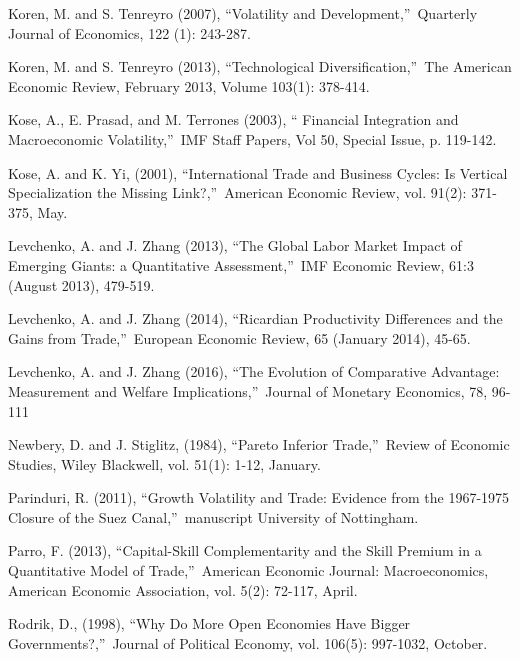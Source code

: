 \documentclass[12pt]{article}
\begin{document}
\begin{thebibliography}{99}
\bibitem{} Koren, M. and S. Tenreyro (2007), \textquotedblleft Volatility
and Development,\textquotedblright\ Quarterly Journal of Economics, 122 (1):
243-287.

\bibitem{} Koren, M. and S. Tenreyro (2013), \textquotedblleft Technological
Diversification,\textquotedblright\ The American Economic Review, February
2013, Volume 103(1): 378-414.

\bibitem{} Kose, A., E. Prasad, and M. Terrones (2003), \textquotedblleft
Financial Integration and Macroeconomic Volatility,\textquotedblright\ IMF
Staff Papers, Vol 50, Special Issue, p. 119-142.

\bibitem{} Kose, A. and K. Yi, (2001), \textquotedblleft International Trade
and Business Cycles: Is Vertical Specialization the Missing
Link?,\textquotedblright\ American Economic Review, vol. 91(2): 371-375, May.

\bibitem{} Levchenko, A. and J. Zhang (2013), \textquotedblleft The Global
Labor Market Impact of Emerging Giants: a Quantitative
Assessment,\textquotedblright\ IMF Economic Review, 61:3 (August 2013),
479-519.

\bibitem{} Levchenko, A. and J. Zhang (2014), \textquotedblleft Ricardian
Productivity Differences and the Gains from Trade,\textquotedblright\
European Economic Review, 65 (January 2014), 45-65.

\bibitem{} Levchenko, A. and J. Zhang (2016), \textquotedblleft The
Evolution of Comparative Advantage: Measurement and Welfare
Implications,\textquotedblright\ Journal of Monetary Economics, 78, 96-111

\bibitem{} Newbery, D. and J. Stiglitz, (1984), \textquotedblleft Pareto
Inferior Trade,\textquotedblright\ Review of Economic Studies, Wiley
Blackwell, vol. 51(1): 1-12, January.

\bibitem{} Parinduri, R. (2011), \textquotedblleft Growth Volatility and
Trade: Evidence from the 1967-1975 Closure of the Suez
Canal,\textquotedblright\ manuscript University of Nottingham.

\bibitem{} Parro, F. (2013), \textquotedblleft Capital-Skill Complementarity
and the Skill Premium in a Quantitative Model of Trade,\textquotedblright\
American Economic Journal: Macroeconomics, American Economic Association,
vol. 5(2): 72-117, April.

\bibitem{} Rodrik, D., (1998), \textquotedblleft Why Do More Open Economies
Have Bigger Governments?,\textquotedblright\ Journal of Political Economy,
vol. 106(5): 997-1032, October.


\end{thebibliography}
\end{document}
